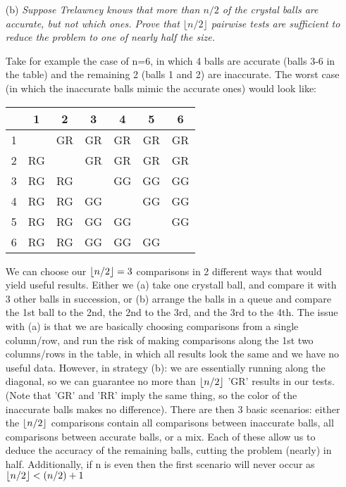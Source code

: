 \documentclass[12pt]{article} \setlength{\oddsidemargin}{0in}
\DeclarePairedDelimiter\floor{\lfloor}{\rfloor}
\begin{document}
{\begin{enumerate}
  Thus there would be no way to distinguish which set of balls is accurate and which are inaccurate, or even if there are any accurate balls at all.  

\newpage
\item[(b)]{\textit{Suppose Trelawney knows that more than $n/2$ of the crystal
    balls are accurate, but not which ones. Prove that
    $\lfloor{n/2}\rfloor$ pairwise tests are sufficient to reduce the problem to
    one of nearly half the size.}}
  \medskip

  Take for example the case of n=6, in which 4 balls are accurate (balls 3-6 in the table) and the remaining 2 (balls 1 and 2) are inaccurate. The worst case (in which the inaccurate balls mimic the accurate ones) would look like: 
  \begin{center}
  \begin{tabular}{ |c|c|c|c|c|c|c| } 
   \hline
    & 1 & 2 & 3 & 4 & 5 & 6\\ 
   \hline
   1 &  & GR & GR & GR & GR & GR \\ 
   2 & RG &  & GR & GR & GR & GR \\ 
   3 & RG & RG &  & GG & GG & GG \\ 
   4 & RG & RG & GG &  & GG & GG \\ 
   5 & RG & RG & GG & GG &  & GG \\ 
   6 & RG & RG & GG & GG & GG &  \\ 
   \hline
  \end{tabular}
  \end{center}
  We can choose our $\floor{n/2} = 3$ comparisons in 2 different ways that would yield useful results. Either we (a) take one crystall ball, and compare it with 3 other balls in succession, or (b) arrange the balls in a queue and compare the 1st ball to the 2nd, the 2nd to the 3rd, and the 3rd to the 4th. The issue with (a) is that we are basically choosing comparisons from a single column/row, and run the risk of making comparisons along the 1st two columns/rows in the table, in which all results look the same and we have no useful data. However, in strategy (b): we are essentially running along the diagonal, so we can guarantee no more than $\floor{n/2}$ 'GR' results in our tests. (Note that 'GR' and 'RR' imply the same thing, so the color of the inaccurate balls makes no difference). There are then 3 basic scenarios: either the $\floor{n/2}$ comparisons contain all comparisons between inaccurate balls, all comparisons between accurate balls, or a mix. Each of these allow us to deduce the accuracy of the remaining balls, cutting the problem (nearly) in half. Additionally, if n is even then the first scenario will never occur as $\floor{n/2} < (n/2) + 1$ \\

\end{enumerate}}
\end{document}
